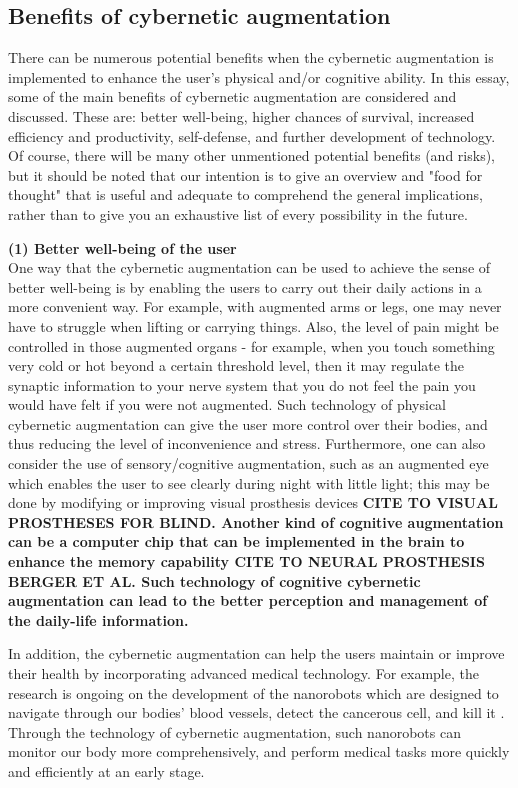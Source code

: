 \subsection{Benefits of cybernetic augmentation}

There can be numerous potential benefits when the cybernetic augmentation is implemented to enhance the user's physical and/or cognitive ability. In this essay, some of the main benefits of cybernetic augmentation are considered and discussed. These are: better well-being, higher chances of survival, increased efficiency and productivity, self-defense, and further development of technology. Of course, there will be many other unmentioned potential benefits (and risks), but it should be noted that our intention is to give an overview and "food for thought" that is useful and adequate to comprehend the general implications, rather than to give you an exhaustive list of every possibility in the future. 

{\bf (1) Better well-being of the user} \\
One way that the cybernetic augmentation can be used to achieve the sense of better well-being is by enabling the users to carry out their daily actions in a more convenient way. For example, with augmented arms or legs, one may never have to struggle when lifting or carrying things. Also, the level of pain might be controlled in those augmented organs - for example, when you touch something very cold or hot beyond a certain threshold level, then it may regulate the synaptic information to your nerve system that you do not feel the pain you would have felt if you were not augmented. Such technology of physical cybernetic augmentation can give the user more control over their bodies, and thus reducing the level of inconvenience and stress. Furthermore, one can also consider the use of sensory/cognitive augmentation, such as an augmented eye which enables the user to see clearly during night with little light; this may be done by modifying or improving visual prosthesis devices \bf{CITE TO VISUAL PROSTHESES FOR BLIND}. Another kind of cognitive augmentation can be a computer chip that can be implemented in the brain to enhance the memory capability \bf{CITE TO NEURAL PROSTHESIS BERGER ET AL}. Such technology of cognitive cybernetic augmentation can lead to the better perception and management of the daily-life information.

In addition, the cybernetic augmentation can help the users maintain or improve their health by incorporating advanced medical technology. For example, the research is ongoing on the development of the nanorobots which are designed to navigate through our bodies' blood vessels, detect the cancerous cell, and kill it \cite{nanorobot}. Through the technology of cybernetic augmentation, such nanorobots can monitor our body more comprehensively, and perform medical tasks more quickly and efficiently at an early stage. 

